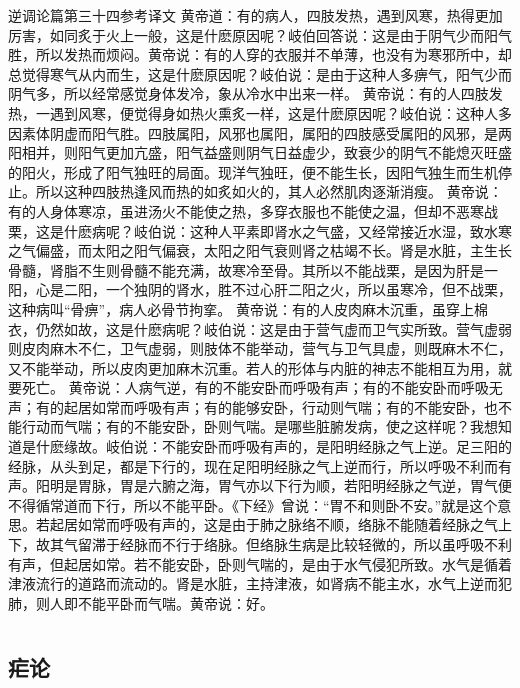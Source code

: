 \documentclass[a4paper,12pt,UTF8,twoside]{ctexbook}
\begin{document}
逆调论篇第三十四参考译文
黄帝道：有的病人，四肢发热，遇到风寒，热得更加厉害，如同炙于火上一般，这是什麽原因呢？岐伯回答说：这是由于阴气少而阳气胜，所以发热而烦闷。黄帝说：有的人穿的衣服并不单薄，也没有为寒邪所中，却总觉得寒气从内而生，这是什麽原因呢？岐伯说：是由于这种人多痹气，阳气少而阴气多，所以经常感觉身体发冷，象从冷水中出来一样。
黄帝说：有的人四肢发热，一遇到风寒，便觉得身如热火熏炙一样，这是什麽原因呢？岐伯说：这种人多因素体阴虚而阳气胜。四肢属阳，风邪也属阳，属阳的四肢感受属阳的风邪，是两阳相并，则阳气更加亢盛，阳气益盛则阴气日益虚少，致衰少的阴气不能熄灭旺盛的阳火，形成了阳气独旺的局面。现洋气独旺，便不能生长，因阳气独生而生机停止。所以这种四肢热逢风而热的如炙如火的，其人必然肌肉逐渐消瘦。
黄帝说：有的人身体寒凉，虽进汤火不能使之热，多穿衣服也不能使之温，但却不恶寒战栗，这是什麽病呢？岐伯说：这种人平素即肾水之气盛，又经常接近水湿，致水寒之气偏盛，而太阳之阳气偏衰，太阳之阳气衰则肾之枯竭不长。肾是水脏，主生长骨髓，肾脂不生则骨髓不能充满，故寒冷至骨。其所以不能战栗，是因为肝是一阳，心是二阳，一个独阴的肾水，胜不过心肝二阳之火，所以虽寒冷，但不战栗，这种病叫“骨痹”，病人必骨节拘挛。
黄帝说：有的人皮肉麻木沉重，虽穿上棉衣，仍然如故，这是什麽病呢？岐伯说：这是由于营气虚而卫气实所致。营气虚弱则皮肉麻木不仁，卫气虚弱，则肢体不能举动，营气与卫气具虚，则既麻木不仁，又不能举动，所以皮肉更加麻木沉重。若人的形体与内脏的神志不能相互为用，就要死亡。
黄帝说：人病气逆，有的不能安卧而呼吸有声；有的不能安卧而呼吸无声；有的起居如常而呼吸有声；有的能够安卧，行动则气喘；有的不能安卧，也不能行动而气喘；有的不能安卧，卧则气喘。是哪些脏腑发病，使之这样呢？我想知道是什麽缘故。岐伯说：不能安卧而呼吸有声的，是阳明经脉之气上逆。足三阳的经脉，从头到足，都是下行的，现在足阳明经脉之气上逆而行，所以呼吸不利而有声。阳明是胃脉，胃是六腑之海，胃气亦以下行为顺，若阳明经脉之气逆，胃气便不得循常道而下行，所以不能平卧。《下经》曾说：“胃不和则卧不安。”就是这个意思。若起居如常而呼吸有声的，这是由于肺之脉络不顺，络脉不能随着经脉之气上下，故其气留滞于经脉而不行于络脉。但络脉生病是比较轻微的，所以虽呼吸不利有声，但起居如常。若不能安卧，卧则气喘的，是由于水气侵犯所致。水气是循着津液流行的道路而流动的。肾是水脏，主持津液，如肾病不能主水，水气上逆而犯肺，则人即不能平卧而气喘。黄帝说：好。

\part{}

\chapter{疟论}
\end{document}
